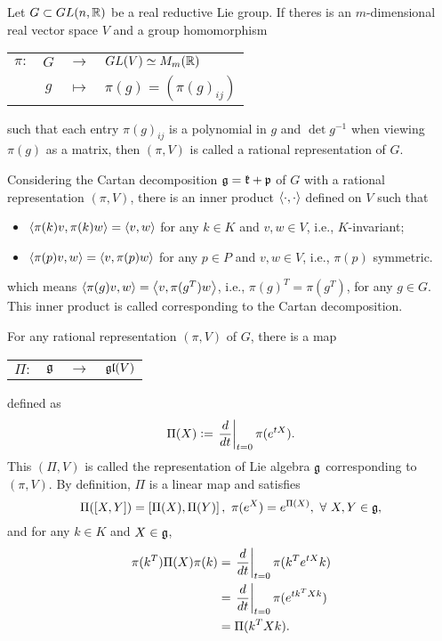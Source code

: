 \documentclass[suri,pdfbookmark]{engsuribt} %
\begin{document}
  \begin{defn}
    Let $G \subset GL(n,\mathbb{R})$ be a real reductive Lie group. If theres is an $m$-dimensional real vector space $V$ and a group homomorphism
    \begin{center}
      \begin{tabular}{l c c l}
        $\pi \colon$ & $G$ & $\longrightarrow$ & $GL(V) \simeq M_m(\mathbb{R})$ \\
        ~& $g$ & $\longmapsto$ & $\pi(g) = (\pi(g)_{ij})$
      \end{tabular}
    \end{center}
    such that each entry $\pi(g)_{ij}$ is a polynomial in $g$ and $\det g^{-1}$ when viewing $\pi(g)$ as a matrix, then $(\pi,V)$ is called a rational representation of $G$.
  \end{defn}

  Considering the Cartan decomposition $\mathfrak{g} = \mathfrak{k} + \mathfrak{p}$ of $G$ with a rational representation $(\pi,V)$, there is an inner product $\left\langle \cdot,\cdot \right\rangle$ defined on $V$ such that \cite{key16}
  \begin{itemize}
    \item $\left\langle \pi(k)v,\pi(k)w \right\rangle = \left\langle v,w \right\rangle$ for any $k \in K$ and $v,w \in V$, i.e., $K$-invariant;
    \item $\left\langle \pi(p)v,w \right\rangle = \left\langle v,\pi(p)w \right\rangle$ for any $p \in P$ and $v,w \in V$, i.e., $\pi(p)$ symmetric.
  \end{itemize}
  which means $\left\langle \pi(g)v,w \right\rangle = \left\langle v,\pi(g^T)w \right\rangle$, i.e., $\pi(g)^T = \pi(g^T)$, for any $g \in G$. This inner product is called corresponding to the Cartan decomposition.

  For any rational representation $(\pi,V)$ of $G$, there is a map
  \begin{center}
    \begin{tabular}{l c c l}
      $\Pi \colon$ & $\mathfrak{g}$ & $\longrightarrow$ & $\mathfrak{gl}(V)$
    \end{tabular}
  \end{center}
  defined as
  \begin{equation*}
    \Pi(X) \vcentcolon= \left.\frac{d}{dt}\right\lvert_{t=0}\pi(e^{tX}).
  \end{equation*}
  This $(\Pi,V)$ is called the representation of Lie algebra $\mathfrak{g}$ corresponding to $(\pi,V)$. By definition, $\Pi$ is a linear map and satisfies
  \begin{equation*}
    \Pi([X,Y]) = \left[\Pi(X),\Pi(Y)\right],~\pi(e^X) = e^{\Pi(X)},~\forall~X,Y \in \mathfrak{g},
  \end{equation*}
  and for any $k \in K$ and $X \in \mathfrak{g}$,
  \begin{equation}\label{eq:4}
    \begin{split}
      \pi(k^T)\Pi(X)\pi(k) &= \left.\frac{d}{dt}\right\lvert_{t=0}\pi(k^Te^{tX}k) \\
      &= \left.\frac{d}{dt}\right\lvert_{t=0}\pi(e^{tk^TXk}) \\
      &= \Pi(k^TXk).
    \end{split}
  \end{equation}
\end{document}
